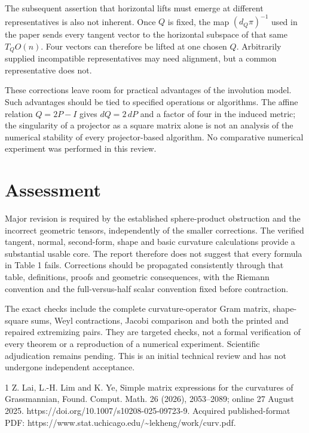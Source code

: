 \documentclass[10pt]{article}
\begin{document}
The subsequent assertion that horizontal lifts must emerge at different representatives is also not inherent. Once \(Q\) is fixed, the map \((d_Q\pi)^{-1}\) used in the paper sends every tangent vector to the horizontal subspace of that same \(T_QO(n)\). Four vectors can therefore be lifted at one chosen \(Q\). Arbitrarily supplied incompatible representatives may need alignment, but a common representative does not.\par
These corrections leave room for practical advantages of the involution model. Such advantages should be tied to specified operations or algorithms. The affine relation \(Q=2P-I\) gives \(dQ=2\,dP\) and a factor of four in the induced metric; the singularity of a projector as a square matrix alone is not an analysis of the numerical stability of every projector-based algorithm. No comparative numerical experiment was performed in this review.\par
\section*{Assessment}
Major revision is required by the established sphere-product obstruction and the incorrect geometric tensors, independently of the smaller corrections. The verified tangent, normal, second-form, shape and basic curvature calculations provide a substantial usable core. The report therefore does not suggest that every formula in Table 1 fails. Corrections should be propagated consistently through that table, definitions, proofs and geometric consequences, with the Riemann convention and the full-versus-half scalar convention fixed before contraction.\par
The exact checks include the complete curvature-operator Gram matrix, shape-square sums, Weyl contractions, Jacobi comparison and both the printed and repaired extremizing pairs. They are targeted checks, not a formal verification of every theorem or a reproduction of a numerical experiment. Scientific adjudication remains pending. This is an initial technical review and has not undergone independent acceptance.\par
1 Z. Lai, L.-H. Lim and K. Ye, Simple matrix expressions for the curvatures of Grassmannian, Found. Comput. Math. 26 (2026), 2053–2089; online 27 August 2025. https://doi.org/10.1007/s10208-025-09723-9. Acquired published-format PDF: https://www.stat.uchicago.edu/\textasciitilde{}lekheng/work/curv.pdf.\par
\end{document}
